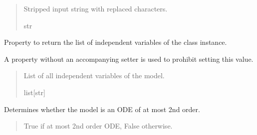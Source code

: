 \documentclass[letterpaper,10pt,english]{sphinxmanual}
\begin{document}
\begin{fulllineitems}
\begin{fulllineitems}
\begin{quote}
\begin{description}
\sphinxAtStartPar
Stripped input string with replaced characters.

\sphinxAtStartPar
str

\end{description}\end{quote}

\end{fulllineitems}


\begin{fulllineitems}
\label{\detokenize{VPCModel:src.VPCModel.VPCModel.independent_var}}
\pysigstartsignatures
{}
\pysigstopsignatures
\sphinxAtStartPar
Property to return the list of independent variables of the class instance.

\sphinxAtStartPar
A property without an accompanying setter is used to prohibit setting this value.
\begin{quote}\begin{description}
\sphinxAtStartPar
List of all independent variables of the model.

\sphinxAtStartPar
list{[}str{]}

\end{description}\end{quote}

\end{fulllineitems}


\begin{fulllineitems}
\label{\detokenize{VPCModel:src.VPCModel.VPCModel.is_ode}}
\pysigstartsignatures
{}
\pysigstopsignatures
\sphinxAtStartPar
Determines whether the model is an ODE of at most 2nd order.
\begin{quote}\begin{description}
\sphinxAtStartPar
True if at most 2nd order ODE, False otherwise.


\end{description}
\end{quote}
\end{fulllineitems}
\end{fulllineitems}
\end{document}
